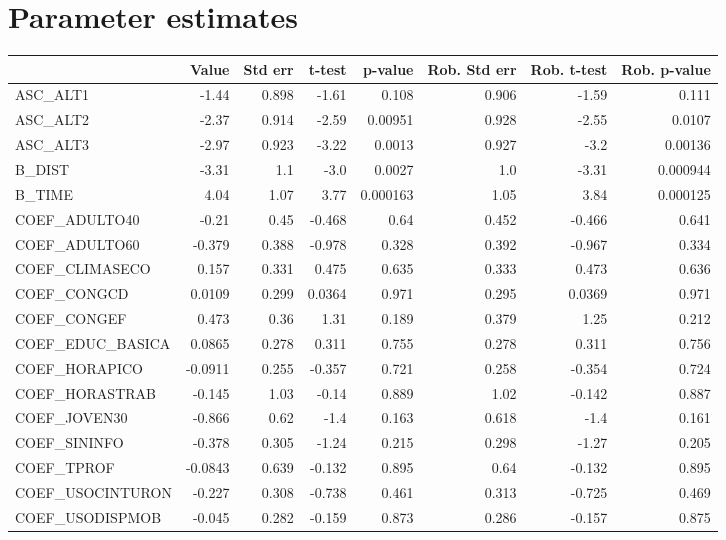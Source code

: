\section{Parameter estimates}
\begin{tabular}{lrrrrrrr}
\toprule
{} &   Value &  Std err &  t-test &  p-value &  Rob. Std err &  Rob. t-test &  Rob. p-value \\
\midrule
ASC\_ALT1         &   -1.44 &    0.898 &   -1.61 &    0.108 &         0.906 &        -1.59 &         0.111 \\
ASC\_ALT2         &   -2.37 &    0.914 &   -2.59 &  0.00951 &         0.928 &        -2.55 &        0.0107 \\
ASC\_ALT3         &   -2.97 &    0.923 &   -3.22 &   0.0013 &         0.927 &         -3.2 &       0.00136 \\
B\_DIST           &   -3.31 &      1.1 &    -3.0 &   0.0027 &           1.0 &        -3.31 &      0.000944 \\
B\_TIME           &    4.04 &     1.07 &    3.77 & 0.000163 &          1.05 &         3.84 &      0.000125 \\
COEF\_ADULTO40    &   -0.21 &     0.45 &  -0.468 &     0.64 &         0.452 &       -0.466 &         0.641 \\
COEF\_ADULTO60    &  -0.379 &    0.388 &  -0.978 &    0.328 &         0.392 &       -0.967 &         0.334 \\
COEF\_CLIMASECO   &   0.157 &    0.331 &   0.475 &    0.635 &         0.333 &        0.473 &         0.636 \\
COEF\_CONGCD      &  0.0109 &    0.299 &  0.0364 &    0.971 &         0.295 &       0.0369 &         0.971 \\
COEF\_CONGEF      &   0.473 &     0.36 &    1.31 &    0.189 &         0.379 &         1.25 &         0.212 \\
COEF\_EDUC\_BASICA &  0.0865 &    0.278 &   0.311 &    0.755 &         0.278 &        0.311 &         0.756 \\
COEF\_HORAPICO    & -0.0911 &    0.255 &  -0.357 &    0.721 &         0.258 &       -0.354 &         0.724 \\
COEF\_HORASTRAB   &  -0.145 &     1.03 &   -0.14 &    0.889 &          1.02 &       -0.142 &         0.887 \\
COEF\_JOVEN30     &  -0.866 &     0.62 &    -1.4 &    0.163 &         0.618 &         -1.4 &         0.161 \\
COEF\_SININFO     &  -0.378 &    0.305 &   -1.24 &    0.215 &         0.298 &        -1.27 &         0.205 \\
COEF\_TPROF       & -0.0843 &    0.639 &  -0.132 &    0.895 &          0.64 &       -0.132 &         0.895 \\
COEF\_USOCINTURON &  -0.227 &    0.308 &  -0.738 &    0.461 &         0.313 &       -0.725 &         0.469 \\
COEF\_USODISPMOB  &  -0.045 &    0.282 &  -0.159 &    0.873 &         0.286 &       -0.157 &         0.875 \\
\bottomrule
\end{tabular}

